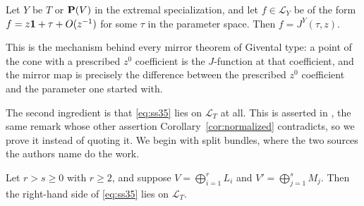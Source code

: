 \begin{lemma}
  \label{lem:jslice}
  Let \(Y\) be \(T\) or \(\mathbf P(V)\) in the extremal specialization, and let
  \(f\in\mathcal L_{Y}\) be of the form \(f=z\mathbf 1+\tau+O(z^{-1})\) for
  some \(\tau\) in the parameter space.  Then \(f=J^{Y}(\tau,z)\).
\end{lemma}

This is the mechanism behind every mirror theorem of Givental type: a point
of the cone with a prescribed \(z^{0}\) coefficient is the \(J\)-function at
that coefficient, and the mirror map is precisely the difference between
the prescribed \(z^{0}\) coefficient and the parameter one started with.

The second ingredient is that \eqref{eq:ss35} lies on \(\mathcal L_{T}\) at
all.  This is asserted in \cite[Remark~4.5(3)]{SS}, the same remark
whose other assertion Corollary~\ref{cor:normalized} contradicts, so we prove
it instead of quoting it.  We begin with split bundles, where the two sources
the authors name do the work.

\begin{lemma}
  \label{lem:cone}
  Let \(r>s\ge0\) with \(r\ge2\), and suppose \(V=\bigoplus_{i=1}^{r}L_{i}\)
  and \(V'=\bigoplus_{j=1}^{s}M_{j}\).  Then the right-hand side of
  \eqref{eq:ss35} lies on \(\mathcal L_{T}\).
\end{lemma}

